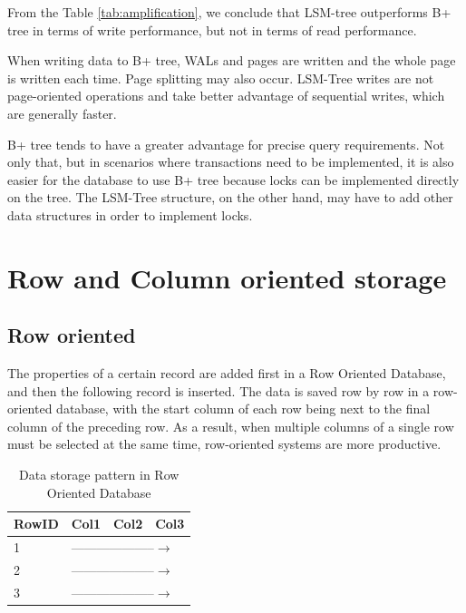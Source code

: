 From the Table \ref{tab:amplification}, we conclude that LSM-tree outperforms B+ tree in terms of write performance, but not in terms of read performance.

When writing data to B+ tree, WALs and pages are written and the whole page is written each time. Page splitting may also occur. LSM-Tree writes are not page-oriented operations and take better advantage of sequential writes, which are generally faster.

B+ tree tends to have a greater advantage for precise query requirements. Not only that, but in scenarios where transactions need to be implemented, it is also easier for the database to use B+ tree because locks can be implemented directly on the tree. The LSM-Tree structure, on the other hand, may have to add other data structures in order to implement locks.

\section{Row and Column oriented storage}
\label{row_column_storage}

\subsection{Row oriented}
The properties of a certain record are added first in a Row Oriented Database, and then the following record is inserted. The data is saved row by row in a row-oriented database, with the start column of each row being next to the final column of the preceding row. As a result, when multiple columns of a single row must be selected at the same time, row-oriented systems are more productive\cite{6495251}. 

\begin{table}[hbt!]
\centering
\begin{tabular}{@{}|l|lll|@{}}
\toprule
RowID & \multicolumn{1}{l|}{Col1} & \multicolumn{1}{l|}{Col2} & Col3 \\ \midrule
1     & \multicolumn{3}{l|}{--------------------$\longrightarrow$}                       \\ \midrule
2     & \multicolumn{3}{l|}{--------------------$\longrightarrow$}                       \\ \midrule
3     & \multicolumn{3}{l|}{--------------------$\longrightarrow$}                       \\ \bottomrule
\end{tabular}
\caption{Data storage pattern in Row Oriented Database}
\label{tab:row_oriented}
\end{table}


